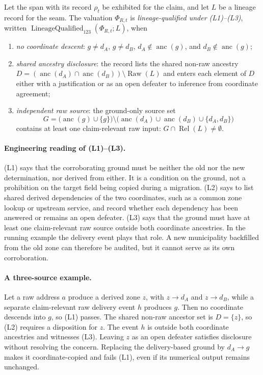 \documentclass[twocolumn,envcountsect,envcountsame,natbib]{svjour3}
\begin{document}
\begin{definition}\label{ex:def:lineage-qualified-three}
Let the span with its record $\rho_t$ be exhibited for the claim, and let $L$ be a lineage record for the seam. The valuation $\Phi_{R,t}$ is \emph{lineage-qualified under (L1)--(L3)}, written $\operatorname{LineageQualified}_{123}(\Phi_{R,t};L)$, when
\begin{enumerate}
\item[(L1)] \emph{no coordinate descent}: $g\neq d_A$, $g\neq d_B$, $d_A\notin\operatorname{anc}(g)$, and $d_B\notin\operatorname{anc}(g)$;
\item[(L2)] \emph{shared ancestry disclosure}: the record lists the shared non-raw ancestry $D=(\operatorname{anc}(d_A)\cap\operatorname{anc}(d_B))\setminus\operatorname{Raw}(L)$ and enters each element of $D$ either with a justification or as an open defeater to inference from coordinate agreement;
\item[(L3)] \emph{independent raw source}: the ground-only source set
\[
G=\bigl(\operatorname{anc}(g)\cup\{g\}\bigr)\setminus
\bigl(\operatorname{anc}(d_A)\cup\operatorname{anc}(d_B)\cup\{d_A,d_B\}\bigr)
\]
contains at least one claim-relevant raw input: $G\cap\operatorname{Rel}(L)\neq\emptyset$.
\end{enumerate}
\end{definition}

\paragraph{Engineering reading of (L1)--(L3).} (L1) says that the corroborating ground must be neither the old nor the new determination, nor derived from either. It is a condition on the ground, not a prohibition on the target field being copied during a migration. (L2) says to list shared derived dependencies of the two coordinates, such as a common zone lookup or upstream service, and record whether each dependency has been answered or remains an open defeater. (L3) says that the ground must have at least one claim-relevant raw source outside both coordinate ancestries. In the running example the delivery event plays that role. A new municipality backfilled from the old zone can therefore be audited, but it cannot serve as its own corroboration.

\paragraph{A three-source example.} Let a raw address $a$ produce a derived zone $z$, with $z\to d_A$ and $z\to d_B$, while a separate claim-relevant raw delivery event $h$ produces $g$. Then no coordinate descends into $g$, so (L1) passes. The shared non-raw ancestor set is $D=\{z\}$, so (L2) requires a disposition for $z$. The event $h$ is outside both coordinate ancestries and witnesses (L3). Leaving $z$ as an open defeater satisfies disclosure without resolving the concern. Replacing the delivery-based ground by $d_A\to g$ makes it coordinate-copied and fails (L1), even if its numerical output remains unchanged.
\end{document}
